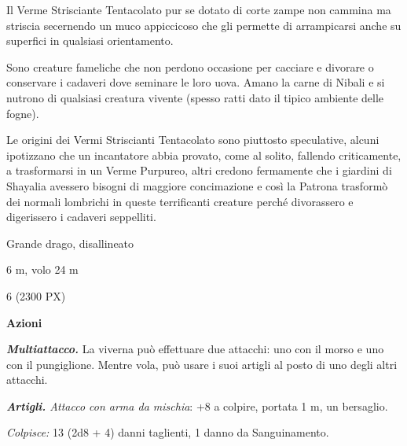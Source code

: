\begin{multicols}{2}
{Il Verme Strisciante Tentacolato pur se dotato di corte zampe non cammina ma striscia secernendo un muco appiccicoso che gli permette di arrampicarsi anche su superfici in qualsiasi orientamento.

Sono creature fameliche che non perdono occasione per cacciare e divorare o conservare i cadaveri dove seminare le loro uova. Amano la carne di Nibali e si nutrono di qualsiasi creatura vivente (spesso ratti dato il tipico ambiente delle fogne).

Le origini dei Vermi Striscianti Tentacolato sono piuttosto speculative, alcuni ipotizzano che un incantatore abbia provato, come al solito, fallendo criticamente, a trasformarsi in un Verme Purpureo, altri credono fermamente che i giardini di Shayalia avessero bisogni di maggiore concimazione e così la Patrona trasformò dei normali lombrichi in queste terrificanti creature perché divorassero e digerissero i cadaveri seppelliti.

\begin{description}[noitemsep, topsep=0pt, parsep=0pt, partopsep=0pt, itemsep=1pt, leftmargin=2.35cm,  labelwidth=2.2cm, itemindent=0cm, listparindent=0pt] %
\setlength{\baselineskip}{10pt}
\item[\textbf{Taglia/Tipo}] Grande drago, disallineato
\item[\textbf{Caratt.}] 
\item[\textbf{Punti Ferita}] 
\item[\textbf{Movimento}] 6 m, volo 24 m
\item[\textbf{Tiri Salvez.}] 
\item[\textbf{Sensi}] 
\item[\textbf{Sfida}] 6 (2300 PX)
\end{description}
\smallskip

\textbf{Azioni}

\emph{\textbf{Multiattacco.}} La viverna può effettuare due attacchi: uno con il morso e uno con il pungiglione. Mentre vola, può usare i suoi artigli al posto di uno degli altri attacchi.

\emph{\textbf{Artigli.} Attacco con arma da mischia}: +8 a colpire, portata 1 m, un bersaglio.

\emph{Colpisce:} 13 (2d8 + 4) danni taglienti, 1 danno da Sanguinamento.

}
\end{multicols}
